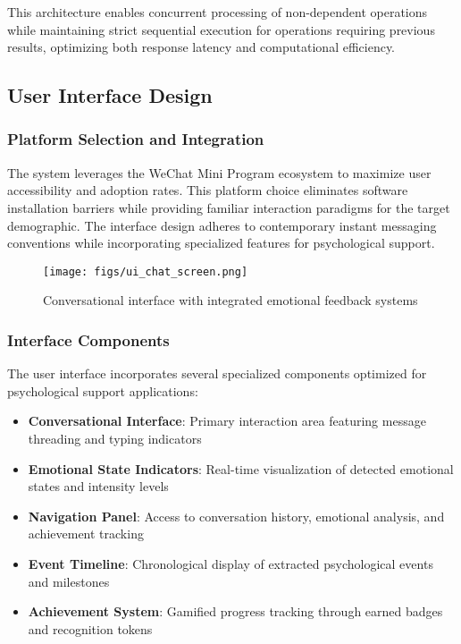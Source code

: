 This architecture enables concurrent processing of non-dependent operations while maintaining strict sequential execution for operations requiring previous results, optimizing both response latency and computational efficiency.

\subsection{User Interface Design}

\subsubsection{Platform Selection and Integration}

The system leverages the WeChat Mini Program ecosystem to maximize user accessibility and adoption rates. This platform choice eliminates software installation barriers while providing familiar interaction paradigms for the target demographic. The interface design adheres to contemporary instant messaging conventions while incorporating specialized features for psychological support.

\begin{figure}[h]
\centering
\texttt{[image: figs/ui\_chat\_screen.png]}
\caption{Conversational interface with integrated emotional feedback systems}
\label{fig:ui_chat_screen}
\end{figure}

\subsubsection{Interface Components}

The user interface incorporates several specialized components optimized for psychological support applications:

\begin{itemize}
\item \textbf{Conversational Interface}: Primary interaction area featuring message threading and typing indicators
\item \textbf{Emotional State Indicators}: Real-time visualization of detected emotional states and intensity levels
\item \textbf{Navigation Panel}: Access to conversation history, emotional analysis, and achievement tracking
\item \textbf{Event Timeline}: Chronological display of extracted psychological events and milestones
\item \textbf{Achievement System}: Gamified progress tracking through earned badges and recognition tokens
\end{itemize}

